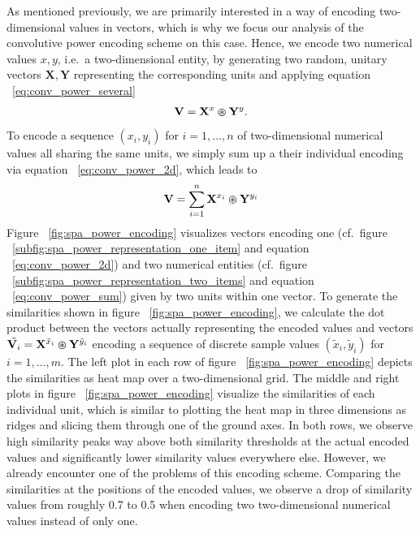 As mentioned previously, we are primarily interested in a way of encoding two-dimensional values in vectors, which is why we focus our analysis of the convolutive power encoding scheme on this case.
Hence, we encode two numerical values $x,y$, i.e.\ a two-dimensional entity, by generating two random, unitary vectors $ \mathbf{X}, \mathbf{Y} $ representing the corresponding units and applying equation ~\ref{eq:conv_power_several} 
\begin{equation}
\label{eq:conv_power_2d}
\mathbf{V} = \mathbf{X}^{x} \varoast \mathbf{Y}^{y}.
\end{equation}
To encode a sequence $ \left(x_{i}, y_{i}\right) $ for $i=1, \ldots, n$ of two-dimensional numerical values all sharing the same units, we simply sum up a their individual encoding via equation ~\ref{eq:conv_power_2d}, which leads to
\begin{equation}
\label{eq:conv_power_sum}
\mathbf{V} = \sum\limits_{i=1}^{n} \mathbf{X}^{x_i} \varoast \mathbf{Y}^{y_i}
\end{equation}
Figure ~\ref{fig:spa_power_encoding} visualizes vectors encoding one (cf.\ figure ~\ref{subfig:spa_power_representation_one_item} and equation ~\ref{eq:conv_power_2d}) and two numerical entities (cf.\ figure ~\ref{subfig:spa_power_representation_two_items} and equation ~\ref{eq:conv_power_sum}) given by two units within one vector.
To generate the similarities shown in figure ~\ref{fig:spa_power_encoding}, we calculate the dot product between the vectors actually representing the encoded values and vectors $ \tilde{\mathbf{V}_{i}} = \mathbf{X}^{\tilde{x}_{i}} \varoast \mathbf{Y}^{\tilde{y}_i} $ encoding a sequence of discrete sample values $ \left( \tilde{x}_{i}, \tilde{y}_{i} \right)$ for $i=1, \ldots, m$.
The left plot in each row of figure ~\ref{fig:spa_power_encoding} depicts the similarities as heat map over a two-dimensional grid. 
The middle and right plots in figure ~\ref{fig:spa_power_encoding} visualize the similarities of each individual unit, which is similar to plotting the heat map in three dimensions as ridges and slicing them through one of the ground axes.
In both rows, we observe high similarity peaks way above both similarity thresholds at the actual encoded values and significantly lower similarity values everywhere else.
However, we already encounter one of the problems of this encoding scheme.
Comparing the similarities at the positions of the encoded values, we observe a drop of similarity values from roughly \num{0.7} to \num{0.5} when encoding two two-dimensional numerical values instead of only one.
